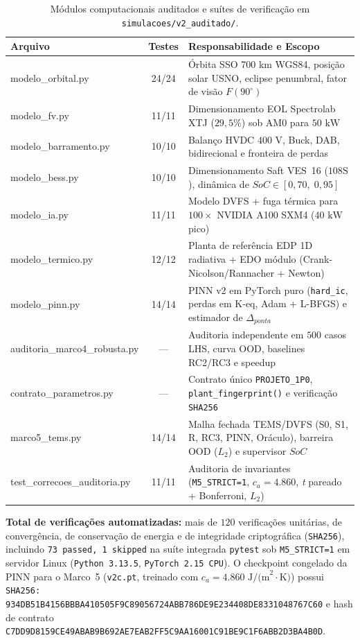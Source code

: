 \begin{table}[htbp]
\centering
\footnotesize
\setlength{\tabcolsep}{4pt}
\caption{Módulos computacionais auditados e suítes de verificação em \texttt{simulacoes/v2\_auditado/}.}
\label{tab:catalogo_modulos}
\begin{tabularx}{\textwidth}{>{\ttfamily\raggedright\arraybackslash}p{5.2cm}c>{\raggedright\arraybackslash}X}
\toprule
\textbf{\textrm{Arquivo}} & \textbf{Testes} & \textbf{Responsabilidade e Escopo} \\
\midrule
modelo\_orbital.py & 24/24 & Órbita SSO 700 km WGS84, posição solar USNO, eclipse penumbral, fator de visão $F(90^\circ)$ \\
modelo\_fv.py & 11/11 & Dimensionamento EOL Spectrolab XTJ ($29{,}5\%$) sob AM0 para $50\text{ kW}$ \\
modelo\_barramento.py & 10/10 & Balanço HVDC $400\text{ V}$, Buck, DAB, bidirecional e fronteira de perdas \\
modelo\_bess.py & 10/10 & Dimensionamento Saft VES~16 ($108\text{S}$), dinâmica de $SoC \in [0{,}70,\; 0{,}95]$ \\
modelo\_ia.py & 11/11 & Modelo DVFS + fuga térmica para $100\times$ NVIDIA A100 SXM4 ($40\text{ kW}$ pico) \\
modelo\_termico.py & 12/12 & Planta de referência EDP 1D radiativa + EDO módulo (Crank-Nicolson/Rannacher + Newton) \\
modelo\_pinn.py & 14/14 & PINN v2 em PyTorch puro (\texttt{hard\_ic}, perdas em K-eq, Adam + L-BFGS) e estimador de $\Delta_{ponta}$ \\
auditoria\_marco4\_robusta.py & — & Auditoria independente em $500$ casos LHS, curva OOD, baselines RC2/RC3 e speedup \\
contrato\_parametros.py & — & Contrato único \texttt{PROJETO\_1P0}, \texttt{plant\_fingerprint()} e verificação \texttt{SHA256} \\
marco5\_tems.py & 14/14 & Malha fechada TEMS/DVFS (S0, S1, R, RC3, PINN, Oráculo), barreira OOD ($L_2$) e supervisor $SoC$ \\
test\_correcoes\_auditoria.py & 11/11 & Auditoria de invariantes (\texttt{M5\_STRICT=1}, $c_a = 4.860$, \textit{t} pareado + Bonferroni, $L_2$) \\
\bottomrule
\end{tabularx}
\end{table}

\noindent\textbf{Total de verificações automatizadas:} mais de $120$ verificações unitárias, de convergência, de conservação de energia e de integridade criptográfica (\texttt{SHA256}), incluindo \texttt{73 passed, 1 skipped} na suíte integrada \texttt{pytest} sob \texttt{M5\_STRICT=1} em servidor Linux (\texttt{Python 3.13.5}, \texttt{PyTorch 2.15 CPU}). O checkpoint congelado da PINN para o Marco~5 (\texttt{v2c.pt}, treinado com $c_a = 4.860\text{ J/(m}^2\cdot\text{K)}$) possui \texttt{SHA256: 934DB51B4156BBBA410505F9C89056724ABB786DE9E234408DE8331048767C60} e hash de contrato \texttt{C7DD9D8159CE49ABAB9B692AE7EAB2FF5C9AA16001C91BE9C1F6ABB2D3BA4B0D}.
